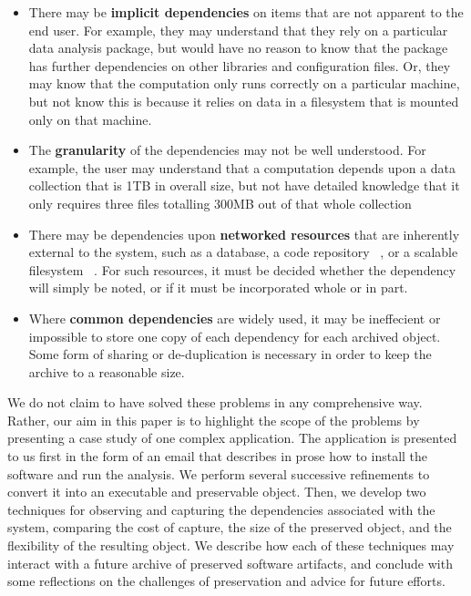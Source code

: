 \documentclass{acm_proc_article-sp}
\begin{document}
\begin{itemize}
\item There may be {\bf implicit dependencies} on items that are
not apparent to the end user.  For example, they may understand that
they rely on a particular data analysis package, but would have
no reason to know that the package has further dependencies on
other libraries and configuration files.  Or, they may know that
the computation only runs correctly on a particular machine, but
not know this is because it relies on data in a filesystem that
is mounted only on that machine.

\item The {\bf granularity} of the dependencies may not be well understood.
For example, the user may understand that a computation depends upon
a data collection that is 1TB in overall size, but not have detailed
knowledge that it only requires three files totalling 300MB out of that
whole collection

\item There may be dependencies upon {\bf networked resources} that
are inherently external to the system, such as a database, a code
repository ~\cite{cms2006cmssw}, or a scalable filesystem ~\cite{blomer2011cernvm}.  For such resources, it
must be decided whether the dependency will simply be noted, or if it
must be incorporated whole or in part.

\item Where {\bf common dependencies} are widely used, it may be ineffecient or
impossible to store one copy of each dependency for each archived object.
Some form of sharing or de-duplication is necessary in order to keep
the archive to a reasonable size.
\end{itemize}

We do not claim to have solved these problems in any comprehensive
way.  Rather, our aim in this paper is to highlight the scope
of the problems by presenting a case study of one complex application.
The application is presented to us
first in the form of an email that describes in prose how to install
the software and run the analysis.  We perform several successive
refinements to convert it into an executable and preservable object.
Then, we develop two techniques for observing and capturing the
dependencies associated with the system, comparing the cost of capture,
the size of the preserved object, and the flexibility of the resulting
object.  We describe how each of these techniques may interact with
a future archive of preserved software artifacts, and conclude with
some reflections on the challenges of preservation and advice for future efforts.
\end{document}
